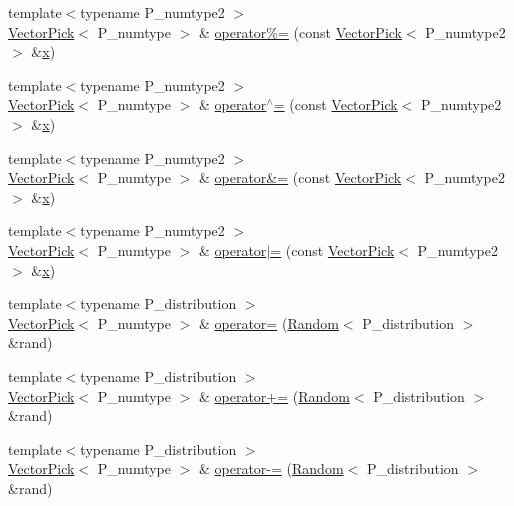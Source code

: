 \begin{DoxyCompactItemize}
\item 
{\footnotesize template$<$typename P\+\_\+numtype2 $>$ }\\\hyperlink{classVectorPick}{Vector\+Pick}$<$ P\+\_\+numtype $>$ \& \hyperlink{classVectorPick_a889c7368b589ee8a7c3f52585f533a65}{operator\%=} (const \hyperlink{classVectorPick}{Vector\+Pick}$<$ P\+\_\+numtype2 $>$ \&\hyperlink{vecnorm1_8cc_ac73eed9e41ec09d58f112f06c2d6cb63}{x})
\item 
{\footnotesize template$<$typename P\+\_\+numtype2 $>$ }\\\hyperlink{classVectorPick}{Vector\+Pick}$<$ P\+\_\+numtype $>$ \& \hyperlink{classVectorPick_a2f0034b4cfdc1b02eb3727cda8559892}{operator$^\wedge$=} (const \hyperlink{classVectorPick}{Vector\+Pick}$<$ P\+\_\+numtype2 $>$ \&\hyperlink{vecnorm1_8cc_ac73eed9e41ec09d58f112f06c2d6cb63}{x})
\item 
{\footnotesize template$<$typename P\+\_\+numtype2 $>$ }\\\hyperlink{classVectorPick}{Vector\+Pick}$<$ P\+\_\+numtype $>$ \& \hyperlink{classVectorPick_ac030d365ef70565395f214ff0eb0ece1}{operator\&=} (const \hyperlink{classVectorPick}{Vector\+Pick}$<$ P\+\_\+numtype2 $>$ \&\hyperlink{vecnorm1_8cc_ac73eed9e41ec09d58f112f06c2d6cb63}{x})
\item 
{\footnotesize template$<$typename P\+\_\+numtype2 $>$ }\\\hyperlink{classVectorPick}{Vector\+Pick}$<$ P\+\_\+numtype $>$ \& \hyperlink{classVectorPick_adf8d68e47c9a047058c7bf5915a794ab}{operator$\vert$=} (const \hyperlink{classVectorPick}{Vector\+Pick}$<$ P\+\_\+numtype2 $>$ \&\hyperlink{vecnorm1_8cc_ac73eed9e41ec09d58f112f06c2d6cb63}{x})
\item 
{\footnotesize template$<$typename P\+\_\+distribution $>$ }\\\hyperlink{classVectorPick}{Vector\+Pick}$<$ P\+\_\+numtype $>$ \& \hyperlink{classVectorPick_a2648aa7bf7d0d0d6555f78fc16f2428e}{operator=} (\hyperlink{classRandom}{Random}$<$ P\+\_\+distribution $>$ \&rand)
\item 
{\footnotesize template$<$typename P\+\_\+distribution $>$ }\\\hyperlink{classVectorPick}{Vector\+Pick}$<$ P\+\_\+numtype $>$ \& \hyperlink{classVectorPick_a4fce090ec9d645aaea2ccd7369902773}{operator+=} (\hyperlink{classRandom}{Random}$<$ P\+\_\+distribution $>$ \&rand)
\item 
{\footnotesize template$<$typename P\+\_\+distribution $>$ }\\\hyperlink{classVectorPick}{Vector\+Pick}$<$ P\+\_\+numtype $>$ \& \hyperlink{classVectorPick_a7570666d4d75f8c4780199a41312c4e5}{operator-\/=} (\hyperlink{classRandom}{Random}$<$ P\+\_\+distribution $>$ \&rand)

\end{DoxyCompactItemize}
